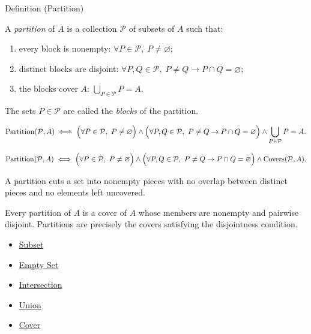 \begin{definitionbox}{Definition (Partition)}
\begin{definition}[Partition]\label{def:partition}
A \emph{partition} of $A$ is a collection $\mathcal{P}$ of subsets of $A$ such
that:
\begin{enumerate}[label=(\roman*)]
\item every block is nonempty: $\forall P \in \mathcal{P},\; P \neq \varnothing$;
\item distinct blocks are disjoint:
$\forall P,Q \in \mathcal{P},\; P \neq Q \rightarrow P \cap Q = \varnothing$;
\item the blocks cover $A$: $\bigcup_{P \in \mathcal{P}} P = A$.
\end{enumerate}
The sets $P \in \mathcal{P}$ are called the \emph{blocks} of the partition.
\end{definition}
\end{definitionbox}

\begin{remark*}
\[
  \operatorname{Partition}(\mathcal{P},A)
  \iff
  \Bigl(\forall P\in\mathcal{P},\ P\neq\varnothing\Bigr)
  \wedge
  \Bigl(\forall P,Q\in\mathcal{P},\ P\neq Q\to P\cap Q=\varnothing\Bigr)
  \wedge
  \bigcup_{P\in\mathcal{P}}P=A.
\]
\end{remark*}

\begin{remark*}
\[
  \operatorname{Partition}(\mathcal{P},A)
  \iff
  \Bigl(\forall P\in\mathcal{P},\ P\neq\varnothing\Bigr)
  \wedge
  \Bigl(\forall P,Q\in\mathcal{P},\ P\neq Q\to P\cap Q=\varnothing\Bigr)
  \wedge
  \operatorname{Covers}(\mathcal{P},A).
\]
\end{remark*}

\begin{remark*}[Interpretation]
A partition cuts a set into nonempty pieces with no overlap between distinct
pieces and no elements left uncovered.
\end{remark*}

\begin{remark*}[Exposition]
Every partition of $A$ is a cover of $A$ whose members are nonempty and
pairwise disjoint. Partitions are precisely the covers satisfying the
disjointness condition.
\end{remark*}

\begin{dependencies}
\begin{itemize}
  \item \hyperref[def:subset]{Subset}
  \item \hyperref[def:empty-set]{Empty Set}
  \item \hyperref[def:intersection]{Intersection}
  \item \hyperref[def:union]{Union}
  \item \hyperref[def:cover-full]{Cover}
\end{itemize}
\end{dependencies}

